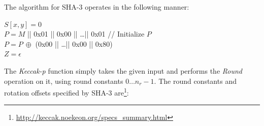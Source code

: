 \documentclass[11pt]{article}
\begin{document}
The algorithm for SHA-3 operates in the following manner:
\vspace{1em}\\
\begin{algorithm}[H]
    $S[x, y] = 0$ \\
    $P = M$ || 0x01 || 0x00 || \dots || 0x01 // Initialize $P$\\
    $P = P~\oplus$ (0x00 || \dots || 0x00 || 0x80) \\
    $Z = \epsilon$
\end{algorithm}
\vspace{1em}
The \emph{Keccak-p} function simply takes the given input and performs the \emph{Round} operation on it, using round
constants $0 \dots n_r - 1$. The round constants and rotation offsets specified by SHA-3
are\footnote{\url{http://keccak.noekeon.org/specs_summary.html}}:
\end{document}
